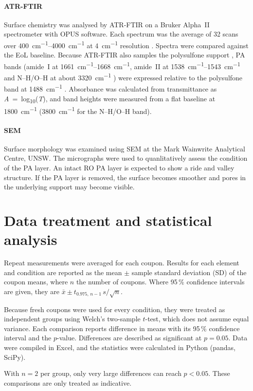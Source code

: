 \paragraph{ATR-FTIR}
Surface chemistry was analysed by ATR-FTIR on a Bruker Alpha~II spectrometer with OPUS software. Each spectrum was the average of 32 scans over \qtyrange{400}{4000}{cm^{-1}} at \qty{4}{cm^{-1}} resolution \citep{Ogbe2025}. Spectra were compared against the EoL baseline. Because ATR-FTIR also samples the polysulfone support \citep{Singh2006}, PA bands (amide~I at \qtyrange{1661}{1668}{cm^{-1}}, amide~II at \qtyrange{1538}{1543}{cm^{-1}}\citep{PrakashRao2003,Kwon2006a} and N--H/O--H at about \qty{3320}{cm^{-1}} \citep{Ogbe2025}) were expressed relative to the polysulfone band at \qty{1488}{cm^{-1}} \citep{Singh2006}. Absorbance was calculated from transmittance as \textit{A}~=~\textminus log\textsubscript{10}(\textit{T}), and band heights were measured from a flat baseline at \qty{1800}{cm^{-1}} (\qty{3800}{cm^{-1}} for the N--H/O--H band).

\paragraph{SEM}
Surface morphology was examined using SEM at the Mark Wainwrite Analytical Centre, UNSW. The micrographs were used to quanlitatively assess  the condition of the PA layer. An intact RO PA layer is expected to show a ride and valley structure. If the PA layer is removed, the surface becomes smoother and pores in the underlying support may become visible. 


\section{Data treatment and statistical analysis}
\label{sec:stats}
Repeat measurements were averaged for each coupon. Results for each element and condition are reported as the mean $\pm$ sample standard deviation (SD) of the coupon means, where $n$ the number of coupons. Where 95\,\% confidence intervals are given, they are $\bar{x}\pm t_{0.975, \, n-1}\,s/\sqrt{n}$. 

Because fresh coupons were used for every condition, they were treated as independent groups using Welch's two-sample $t$-test, which does not assume equal variance. Each comparison reports difference in means with its 95\,\% confidence interval and the $p$-value. Differences are described as significant at $p = 0.05$. Data were compiled in Excel, and the statistics were calculated in Python (pandas, SciPy).

With $n = 2$ per group, only very large differences can reach $p < 0.05$. These comparisons are only treated as indicative. 
